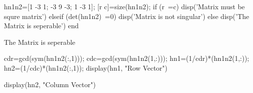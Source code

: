 \documentclass[12pt, onecolumn]{IEEEtran}
\begin{document}
\begin{matlabcode}
hn1n2=[1 -3 1; -3 9 -3; 1 -3 1]; %
[r c]=size(hn1n2);
if (r~=c)
    disp('Matrix must be squre matrix')
elseif (det(hn1n2)~=0)
    disp('Matrix is not singular')
else
    disp('The Matrix is seperable')
end
\end{matlabcode}
\begin{matlaboutput}
The Matrix is seperable
\end{matlaboutput}
\begin{matlabcode}
cdr=gcd(sym(hn1n2(:,1)));
cdc=gcd(sym(hn1n2(1,:)));
hn1=(1/cdr)*(hn1n2(1,:));
hn2=(1/cdc)*(hn1n2(:,1));
display(hn1, "Row Vector")
\end{matlabcode}
\begin{matlabcode}
display(hn2, "Column Vector")
\end{matlabcode}



\vspace{1em}
\end{document}
